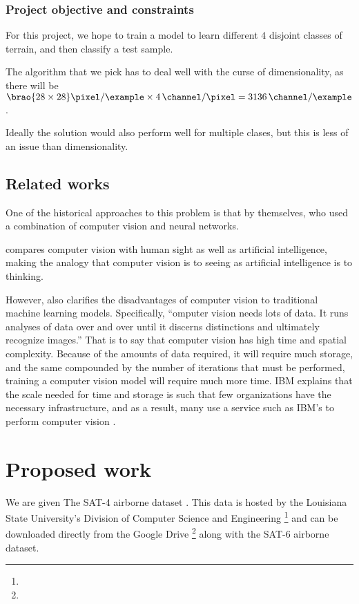 \documentclass[11pt]{article}
\DeclarePairedDelimiter\brao()%
\begin{document}
\subsubsection{Project objective and constraints}

For this project, we hope to train a model to learn different \(4\) disjoint classes of terrain, and then classify a test sample.

The algorithm that we pick has to deal well with the curse of dimensionality,
as there will be
\(
    \SI[parse-numbers=false]{\brao{28\times28}\!}{\pixel\per\example}
    \times \SI4{\channel\per\pixel}
    = \SI{3136}{\channel\per\example}
\).

Ideally the solution would also perform well for multiple clases,
but this is less of an issue than dimensionality.

\subsection{Related works}

One of the historical approaches to this problem is that by \textcite{Basu2015a} themselves,
who
used a combination of computer vision and neural networks.

\textcite{IBM2020a} compares computer vision with human sight as well as artificial intelligence,
making the analogy that computer vision is to seeing as artificial intelligence is to thinking.

However, \textcite{IBM2020a} also clarifies the disadvantages of computer vision to traditional machine learning models.
Specifically, ``omputer vision needs lots of data. It runs analyses of data over and over until it discerns distinctions and ultimately recognize images.''
That is to say that computer vision has high time and spatial complexity.
Because of the amounts of data required,
it will require much storage,
and the same compounded by the number of iterations that must be performed,
training a computer vision model will require much more time.
IBM explains that the scale needed for time and storage is such that few organizations have the necessary infrastructure,
and as a result, many use a service such as IBM's to perform computer vision \cite{IBM2020a}.

\section{Proposed work}

We are given
The SAT-4 airborne dataset%
\cite{Basu2015a}.
This data is hosted by the Louisiana State University's Division of Computer Science and Engineering%
\footnote{%
}
and can be downloaded directly from the Google Drive%
\footnote{%
}
along with the SAT-6 airborne dataset.
\end{document}
